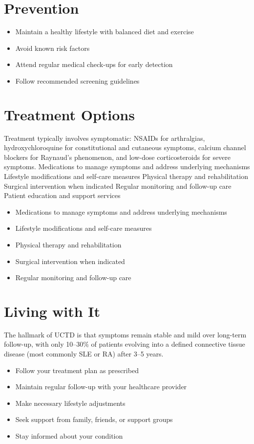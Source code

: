 \section{Prevention}
\begin{itemize}[noitemsep]
  \item Maintain a healthy lifestyle with balanced diet and exercise
  \item Avoid known risk factors
  \item Attend regular medical check-ups for early detection
  \item Follow recommended screening guidelines
\end{itemize}
\section{Treatment Options}
Treatment typically involves symptomatic: NSAIDs for arthralgias, hydroxychloroquine for constitutional and cutaneous symptoms, calcium channel blockers for Raynaud's phenomenon, and low-dose corticosteroids for severe symptoms. Medications to manage symptoms and address underlying mechanisms Lifestyle modifications and self-care measures Physical therapy and rehabilitation Surgical intervention when indicated Regular monitoring and follow-up care Patient education and support services

\begin{itemize}[noitemsep]
  \item Medications to manage symptoms and address underlying mechanisms
  \item Lifestyle modifications and self-care measures
  \item Physical therapy and rehabilitation
  \item Surgical intervention when indicated
  \item Regular monitoring and follow-up care
\end{itemize}
\section{Living with It}
The hallmark of UCTD is that symptoms remain stable and mild over long-term follow-up, with only 10--30\% of patients evolving into a defined connective tissue disease (most commonly SLE or RA) after 3--5 years.

\begin{itemize}[noitemsep]
  \item Follow your treatment plan as prescribed
  \item Maintain regular follow-up with your healthcare provider
  \item Make necessary lifestyle adjustments
  \item Seek support from family, friends, or support groups
  \item Stay informed about your condition
\end{itemize}
